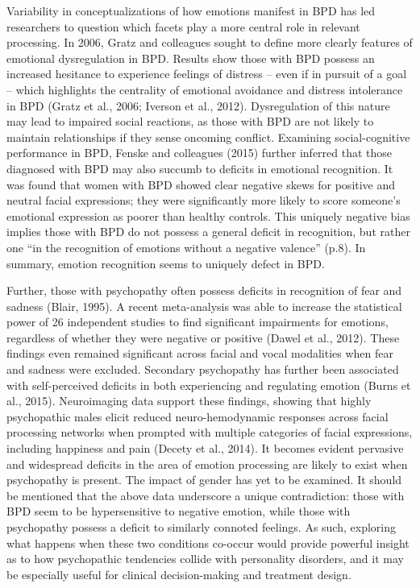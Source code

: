 \documentclass[
  man,floatsintext]{apa7}
\begin{document}
Variability in conceptualizations of how emotions manifest in BPD has led researchers to question which facets play a more central role in relevant processing. In 2006, Gratz and colleagues sought to define more clearly features of emotional dysregulation in BPD. Results show those with BPD possess an increased hesitance to experience feelings of distress -- even if in pursuit of a goal -- which highlights the centrality of emotional avoidance and distress intolerance in BPD (Gratz et al., 2006; Iverson et al., 2012). Dysregulation of this nature may lead to impaired social reactions, as those with BPD are not likely to maintain relationships if they sense oncoming conflict. Examining social-cognitive performance in BPD, Fenske and colleagues (2015) further inferred that those diagnosed with BPD may also succumb to deficits in emotional recognition. It was found that women with BPD showed clear negative skews for positive and neutral facial expressions; they were significantly more likely to score someone's emotional expression as poorer than healthy controls. This uniquely negative bias implies those with BPD do not possess a general deficit in recognition, but rather one ``in the recognition of emotions without a negative valence'' (p.8). In summary, emotion recognition seems to uniquely defect in BPD.

Further, those with psychopathy often possess deficits in recognition of fear and sadness (Blair, 1995). A recent meta-analysis was able to increase the statistical power of 26 independent studies to find significant impairments for emotions, regardless of whether they were negative or positive (Dawel et al., 2012). These findings even remained significant across facial and vocal modalities when fear and sadness were excluded. Secondary psychopathy has further been associated with self-perceived deficits in both experiencing and regulating emotion (Burns et al., 2015). Neuroimaging data support these findings, showing that highly psychopathic males elicit reduced neuro-hemodynamic responses across facial processing networks when prompted with multiple categories of facial expressions, including happiness and pain (Decety et al., 2014). It becomes evident pervasive and widespread deficits in the area of emotion processing are likely to exist when psychopathy is present. The impact of gender has yet to be examined. It should be mentioned that the above data underscore a unique contradiction: those with BPD seem to be hypersensitive to negative emotion, while those with psychopathy possess a deficit to similarly connoted feelings. As such, exploring what happens when these two conditions co-occur would provide powerful insight as to how psychopathic tendencies collide with personality disorders, and it may be especially useful for clinical decision-making and treatment design.
\end{document}
